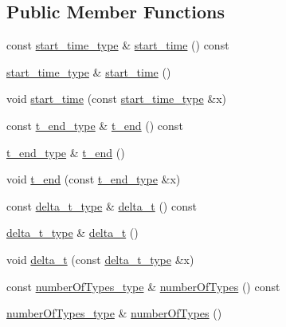 \subsection*{Public Member Functions}
\begin{DoxyCompactItemize}
\item 
const \hyperlink{classpse__t_a2b49c9d348499d75809e2b655582eb6f}{start\-\_\-time\-\_\-type} \& \hyperlink{classpse__t_a28a55f99317bef129c37b03bf9dca7a3}{start\-\_\-time} () const 
\item 
\hyperlink{classpse__t_a2b49c9d348499d75809e2b655582eb6f}{start\-\_\-time\-\_\-type} \& \hyperlink{classpse__t_acac91424c4b53e6cf03f7730d2fdfc4e}{start\-\_\-time} ()
\item 
void \hyperlink{classpse__t_a0f2ad06174e2c781909ac48facf7ef10}{start\-\_\-time} (const \hyperlink{classpse__t_a2b49c9d348499d75809e2b655582eb6f}{start\-\_\-time\-\_\-type} \&x)
\item 
const \hyperlink{classpse__t_ac4239e9fa324e53f5964848e3089fef6}{t\-\_\-end\-\_\-type} \& \hyperlink{classpse__t_ad6ff0c1f53ea1b2aead01da2b10e67fa}{t\-\_\-end} () const 
\item 
\hyperlink{classpse__t_ac4239e9fa324e53f5964848e3089fef6}{t\-\_\-end\-\_\-type} \& \hyperlink{classpse__t_afe6617147ae653198a203a3cf1969789}{t\-\_\-end} ()
\item 
void \hyperlink{classpse__t_a6fe90c1ea798d2a805953d2b74c94050}{t\-\_\-end} (const \hyperlink{classpse__t_ac4239e9fa324e53f5964848e3089fef6}{t\-\_\-end\-\_\-type} \&x)
\item 
const \hyperlink{classpse__t_a7af94a081ff80545fa4d069c4ba56b57}{delta\-\_\-t\-\_\-type} \& \hyperlink{classpse__t_a295fda39af32ccb4903c2589c431d56a}{delta\-\_\-t} () const 
\item 
\hyperlink{classpse__t_a7af94a081ff80545fa4d069c4ba56b57}{delta\-\_\-t\-\_\-type} \& \hyperlink{classpse__t_af963897076ecce82a7cfa4e739a2c821}{delta\-\_\-t} ()
\item 
void \hyperlink{classpse__t_ab5ab165c9d30017fb0cde2b3e55c816a}{delta\-\_\-t} (const \hyperlink{classpse__t_a7af94a081ff80545fa4d069c4ba56b57}{delta\-\_\-t\-\_\-type} \&x)
\item 
const \hyperlink{classpse__t_a3aa6a8cc1b9642304371fb935f6e1965}{number\-Of\-Types\-\_\-type} \& \hyperlink{classpse__t_a26abadfd643121531b460870d6b44dbe}{number\-Of\-Types} () const 
\item 
\hyperlink{classpse__t_a3aa6a8cc1b9642304371fb935f6e1965}{number\-Of\-Types\-\_\-type} \& \hyperlink{classpse__t_a10db3efbceafc329141c4b0e6205f200}{number\-Of\-Types} ()

\end{DoxyCompactItemize}
